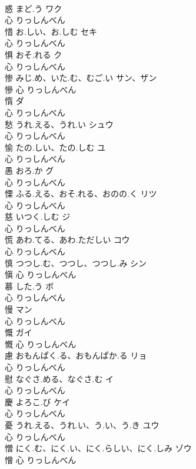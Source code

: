 \documentclass[8pt]{extreport}
\begin{document}
\begin{CJK}{UTF8}{min}
\\	惑	まど.う	ワク	
\\	心		りっしんべん		
\\	惜	お.しい、お.しむ	セキ	
\\	心		りっしんべん		
\\	惧	おそ.れる	ク	
\\	心		りっしんべん		
\\	惨	みじ.め、いた.む、むご.い	サン、ザン	
\\	慘	心		りっしんべん		
\\	惰		ダ	
\\	心		りっしんべん		
\\	愁	うれ.える、うれ.い	シュウ	
\\	心		りっしんべん		
\\	愉	たの.しい、たの.しむ	ユ	
\\	心		りっしんべん		
\\	愚	おろ.か	グ	
\\	心		りっしんべん		
\\	慄	ふる.える、おそ.れる、おのの.く	リツ	
\\	心		りっしんべん		
\\	慈	いつく.しむ	ジ	
\\	心		りっしんべん		
\\	慌	あわ.てる、あわ.ただしい	コウ	
\\	心		りっしんべん		
\\	慎	つつし.む、つつし、つつし.み	シン	
\\	愼	心		りっしんべん		
\\	慕	した.う	ボ	
\\	心		りっしんべん		
\\	慢		マン	
\\	心		りっしんべん		
\\	慨		ガイ	
\\	慨	心		りっしんべん		
\\	慮	おもんぱく.る、おもんぱか.る	リョ	
\\	心		りっしんべん		
\\	慰	なぐさ.める、なぐさ.む	イ	
\\	心		りっしんべん		
\\	慶	よろこ.び	ケイ	
\\	心		りっしんべん		
\\	憂	うれ.える、うれ.い、う.い、う.き	ユウ	
\\	心		りっしんべん		
\\	憎	にく.む、にく.い、にく.らしい、にく.しみ	ゾウ	
\\	憎	心		りっしんべん		

\end{CJK}
\end{document}

